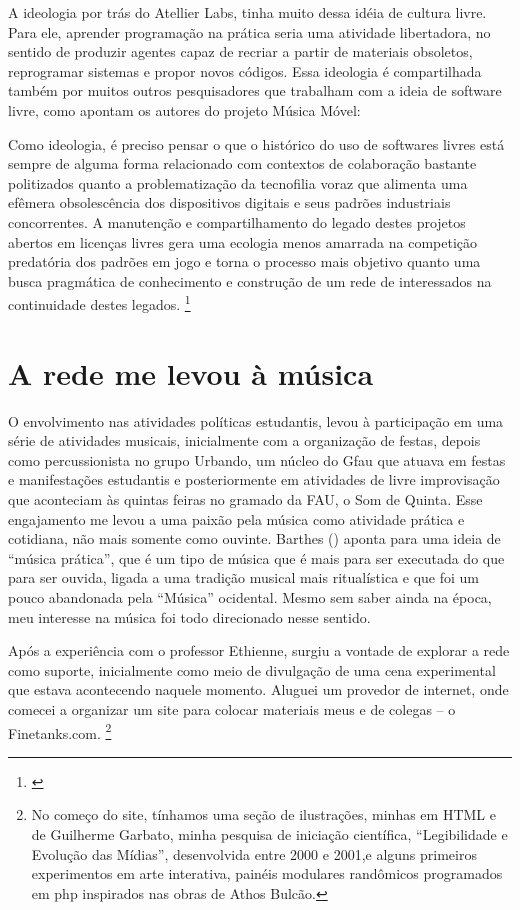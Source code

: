 A ideologia por trás do Atellier Labs, tinha muito dessa idéia de cultura livre. Para ele, aprender programação na prática seria uma atividade libertadora, no sentido de produzir agentes capaz de recriar a partir de materiais obsoletos, reprogramar sistemas e propor novos códigos. Essa ideologia é compartilhada também por muitos outros pesquisadores que trabalham com a ideia de software livre, como apontam os autores do projeto Música Móvel:

\begin{citacao}
Como ideologia, é preciso pensar o que o histórico do uso de softwares livres está sempre de alguma forma relacionado com contextos de colaboração bastante politizados quanto a problematização da tecnofilia voraz que alimenta uma efêmera obsolescência dos dispositivos digitais e seus padrões industriais concorrentes. A manutenção e compartilhamento do legado destes projetos abertos em licenças livres gera uma ecologia menos amarrada na competição predatória dos padrões em jogo e torna o processo mais objetivo quanto uma busca pragmática de conhecimento e construção de um rede de interessados na continuidade destes legados. \footnote{\cite{Rohde2014}}
\end{citacao}



\section{A rede me levou à música}
O envolvimento nas atividades políticas estudantis, levou à participação em uma série de atividades musicais, inicialmente com a organização de festas, depois como percussionista no grupo Urbando, um núcleo do Gfau que atuava em festas e manifestações estudantis e posteriormente em atividades de livre improvisação que aconteciam às quintas feiras no gramado da FAU, o Som de Quinta. Esse engajamento me levou a uma paixão pela música como atividade prática e cotidiana, não mais somente como ouvinte. Barthes (\citeyear{Barthes1978}) aponta para uma ideia de ``música prática'', que é um tipo de música que é mais para ser executada do que para ser ouvida, ligada a uma tradição musical mais ritualística e que foi um pouco abandonada pela ``Música'' ocidental. Mesmo sem saber ainda na época, meu interesse na música foi todo direcionado nesse sentido.


Após a experiência com o professor Ethienne, surgiu a vontade de explorar a rede como suporte, inicialmente como meio de divulgação de uma cena experimental que estava acontecendo naquele momento. Aluguei um provedor de internet, onde comecei a organizar um site para colocar materiais meus e de colegas -- o Finetanks.com. \footnote{No começo do site, tínhamos uma seção de ilustrações, minhas em HTML e de Guilherme Garbato, minha pesquisa de iniciação científica, ``Legibilidade e Evolução das Mídias'', desenvolvida entre 2000 e 2001,e alguns primeiros experimentos em arte interativa, painéis modulares randômicos programados em php inspirados nas obras de Athos Bulcão.}
   
